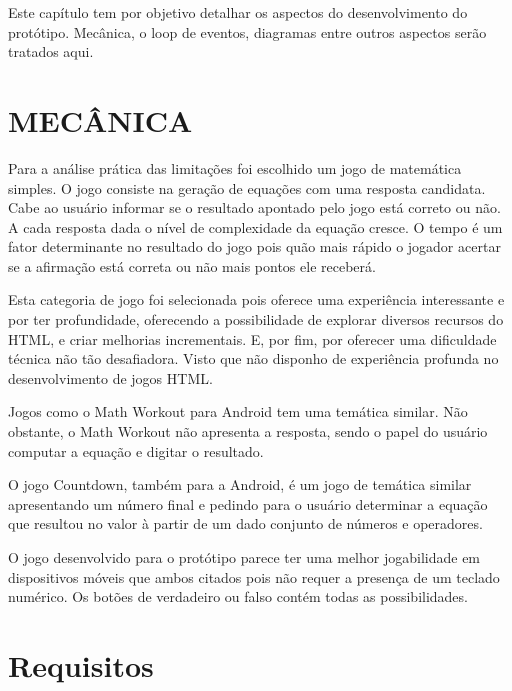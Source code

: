 Este capítulo tem por objetivo detalhar os aspectos do desenvolvimento
do protótipo. Mecânica, o loop de eventos, diagramas entre outros
aspectos serão tratados aqui.

\section{MECÂNICA}

Para a análise prática das limitações foi escolhido um jogo de
matemática simples. O jogo consiste na geração de equações com uma
resposta candidata. Cabe ao usuário informar se o resultado apontado
pelo jogo está correto ou não. A cada resposta dada o nível de
complexidade da equação cresce. O tempo é um fator determinante
no resultado do jogo pois quão mais rápido o jogador acertar se a
afirmação está correta ou não mais pontos ele receberá.

Esta categoria de jogo foi selecionada pois oferece uma experiência
interessante e por ter profundidade, oferecendo a possibilidade de
explorar diversos recursos do HTML, e criar melhorias incrementais. E,
por fim, por oferecer uma dificuldade técnica não tão desafiadora.
Visto que não disponho de experiência profunda no desenvolvimento de
jogos HTML.

Jogos como o Math Workout para Android tem uma temática similar.
Não obstante, o Math Workout não apresenta a resposta, sendo o papel
do usuário computar a equação e digitar o resultado.

O jogo Countdown, também para a Android, é um jogo de temática
similar apresentando um número final e pedindo para o usuário determinar
a equação que resultou no valor à partir de um dado conjunto de
números e operadores.

O jogo desenvolvido para o protótipo parece ter uma melhor jogabilidade
em dispositivos móveis que ambos citados pois não requer a presença
de um teclado numérico. Os botões de verdadeiro ou falso contém todas
as possibilidades.



\section{Requisitos}

